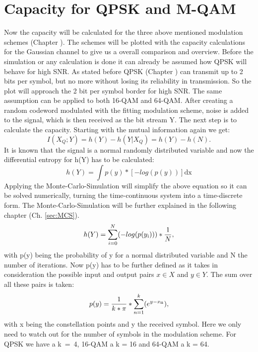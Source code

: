 \section{Capacity for QPSK and M-QAM}
Now the capacity will be calculated for the three above mentioned modulation schemes (Chapter ). The schemes will be plotted with the capacity calculations for the Gaussian channel to give us a overall comparison and overview.
\newline
Before the simulation or any calculation is done it can already be assumed how QPSK will behave for high SNR. As stated before QPSK (Chapter ) can transmit up to 2 bits per symbol, but no more without losing its reliability in transmission. So the plot will approach the 2 bit per symbol border for high SNR. The same assumption can be applied to both 16-QAM and 64-QAM.
After creating a random codeword modulated with the fitting modulation scheme, noise is added to the signal, which is then received as the bit stream Y. The next step is to calculate the capacity. 
\newline
Starting with the mutual information again we get:
\begin{equation}
I(X_Q;Y) = h(Y) - h(Y|X_Q) = h(Y) - h(N).
\end{equation}
It is known that the signal is a normal randomly distributed variable and now the differential entropy for h(Y) has to be calculated: 
\begin{equation}
h(Y) = \int p(y) * [-log(p(y))] \mathrm{dx}
\end{equation}
Applying the Monte-Carlo-Simulation will simplify the above equation so it can be solved numerically, turning the time-continuous system into a time-discrete form. The Monte-Carlo-Simulation will be further explained in the following chapter (Ch. \ref{sec:MCS}).
\begin{equation}
\label{eq:entropy1}
h(Y) =  \sum_{i=0}^N(-log(p(y\textsubscript{i}))) * \frac{1}{N},
\end{equation} 
with p(y) being the probability of y for a normal distributed variable and N the number of iterations. Now p(y) has to be further defined as it takes in consideration the possible input and output pairs $x \in X$ and $y \in Y$. The sum over all these pairs is taken:
\begin{equation}
\label{eq:entropy2}
p(y) = \frac{1}{k*\pi}*\sum_{n=1}^k(e^{y-x\textsubscript{n}}),
\end{equation} 
with x being the constellation points and y the received symbol.
Here we only need to watch out for the number of symbols in the modulation scheme. For QPSK we have a \mbox{k = 4}, 16-QAM a k = 16 and 64-QAM a k = 64.
\newline

